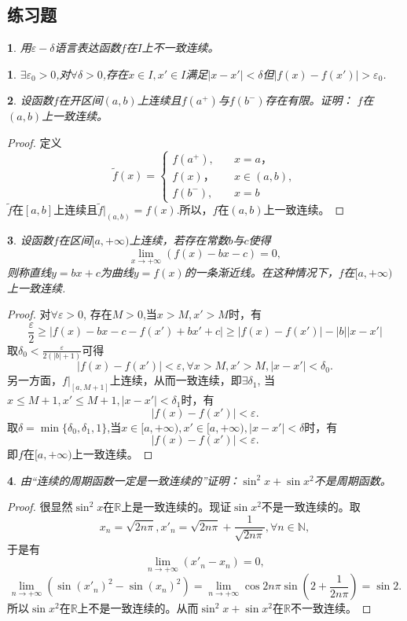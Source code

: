 \documentclass[utf8]{book}
\newtheorem{example}{}[section]             %
\newtheorem{solution}{}
\begin{document}
\subsection{练习题}
\begin{example}
用$\varepsilon-\delta$语言表达函数$f$在$I$上不一致连续。
\end{example}
\begin{solution}
$\exists \varepsilon_0 >0$,对$\forall \delta > 0$,存在$x\in I, x'\in I$满足$|x-x'|<\delta$但$|f(x)-f(x')| > \varepsilon_0$.
\end{solution}
\begin{example}
设函数$f$在开区间$(a,b)$上连续且$f(a^+)$与$f(b^-)$存在有限。证明：
$f$在$(a,b)$上一致连续。
\end{example}
\begin{proof}
定义$$\tilde{f}(x)=
\begin{cases}
f(a^+),\quad&x=a，\\
f(x)， \quad&x\in(a,b),\\
f(b^-),\quad&x=b
\end{cases}$$
$\tilde{f}$在$[a,b]$上连续且$\tilde{f}\big|_{(a,b)} = f(x)$.所以，$f$在$(a,b)$上一致连续。
\end{proof}
\begin{example}
设函数$f$在区间$[a,+\infty)$上连续，若存在常数$b$与$c$使得
$$\displaystyle\lim_{x\to +\infty}(f(x)-bx-c)=0,$$
则称直线$y=bx+c$为曲线$y=f(x)$的一条渐近线。在这种情况下，$f$在$[a,+\infty)$上一致连续.
\end{example}
\begin{proof}
对$\forall \varepsilon > 0$, 存在$M > 0$,当$x > M, x'> M$时，有
$$\frac{\varepsilon}{2} \geq |f(x)-bx-c -f(x')+bx'+c| \geq |f(x)-f(x')|-|b||x-x'|$$
取$\delta_0 < \displaystyle\frac{\varepsilon}{2(|b|+ 1)}$可得
$$|f(x)-f(x')|< \varepsilon, \forall x>M, x'>M, |x-x'| < \delta_0.$$
另一方面，$f|_{[a, M+1]}$上连续，从而一致连续，即$\exists \delta_1$, 
当$x \leq M+1, x' \leq M+1, |x-x'| < \delta_1$时，有$$|f(x)-f(x')| < \varepsilon.$$
取$\delta =\min\{\delta_0,\delta_1, 1\}$,当$x\in[a, +\infty), x'\in[a,+\infty), |x-x'|< \delta$时，有$$|f(x)-f(x')| < \varepsilon.$$
即$f$在$[a,+\infty)$上一致连续。
\end{proof}
\begin{example}由“连续的周期函数一定是一致连续的”证明：$\sin^2{x}+\sin{x^2}$不是周期函数。 
\end{example}
\begin{proof}很显然$\sin^2{x}$在$\mathbb{R}$上是一致连续的。现证$\sin{x^2}$不是一致连续的。取$$x_n=\sqrt{2n\pi}, x'_n = \sqrt{2n\pi}+\frac{1}{\sqrt{2n\pi}},\forall n\in\mathbb{N},$$于是有
$$\displaystyle\lim_{n\to +\infty}(x'_n - x_n)  = 0,$$
$$\displaystyle\lim_{n\to +\infty}(\sin{(x'_n)^2}-\sin{(x_n)^2})=\displaystyle\lim_{n\to +\infty}\cos{2n\pi}\sin{\left(2+\frac{1}{2n\pi}\right)} =\sin{2}.$$
所以$\sin{x^2}$在$\mathbb{R}$上不是一致连续的。从而$\sin^2{x}+\sin{x^2}$在$\mathbb{R}$不一致连续。
\end{proof}
\end{document}
